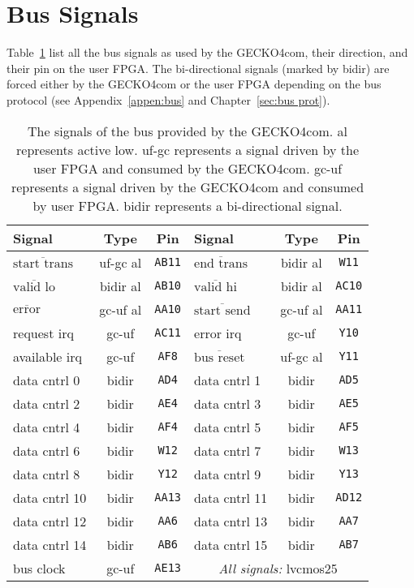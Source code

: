 \section{Bus Signals}
Table~\ref{tab:gecko4 bus signals} list all the bus signals as used by the {\sc
GECKO4com}, their direction, and their pin on the user FPGA. The bi-directional
signals (marked by {\sc bidir}) are forced either by the {\sc GECKO4com} or the
user FPGA depending on the bus protocol (see Appendix~\ref{appen:bus} and
Chapter~\ref{sec:bus prot}).
\begin{table}[hb]
\begin{tabular}{|l|c|c||l|c|c|}
\hline
\textbf{Signal}&\textbf{Type}&\textbf{Pin}&
\textbf{Signal}&\textbf{Type}&\textbf{Pin}\\
\hline
\hline
$\overline{\text{start trans}}$&{\sc uf-gc} {\sc al}&\verb+AB11+&
$\overline{\text{end trans}}$&{\sc bidir} {\sc al}&\verb+W11+\\
\hline
$\overline{\text{valid lo}}$&{\sc bidir} {\sc al}&\verb+AB10+&
$\overline{\text{valid hi}}$&{\sc bidir} {\sc al}&\verb+AC10+\\
\hline
$\overline{\text{error}}$&{\sc gc-uf} {\sc al}&\verb+AA10+&
$\overline{\text{start send}}$&{\sc gc-uf} {\sc al}&\verb+AA11+\\
\hline
request irq&{\sc gc-uf}&\verb+AC11+&
error irq&{\sc gc-uf}&\verb+Y10+\\
\hline
available irq&{\sc gc-uf}&\verb+AF8+&
$\overline{\text{bus reset}}$&{\sc uf-gc} {\sc al}&\verb+Y11+\\
\hline
data cntrl 0&{\sc bidir}&\verb+AD4+&
data cntrl 1&{\sc bidir}&\verb+AD5+\\
\hline
data cntrl 2&{\sc bidir}&\verb+AE4+&
data cntrl 3&{\sc bidir}&\verb+AE5+\\
\hline
data cntrl 4&{\sc bidir}&\verb+AF4+&
data cntrl 5&{\sc bidir}&\verb+AF5+\\
\hline
data cntrl 6&{\sc bidir}&\verb+W12+&
data cntrl 7&{\sc bidir}&\verb+W13+\\
\hline
data cntrl 8&{\sc bidir}&\verb+Y12+&
data cntrl 9&{\sc bidir}&\verb+Y13+\\
\hline
data cntrl 10&{\sc bidir}&\verb+AA13+&
data cntrl 11&{\sc bidir}&\verb+AD12+\\
\hline
data cntrl 12&{\sc bidir}&\verb+AA6+&
data cntrl 13&{\sc bidir}&\verb+AA7+\\
\hline
data cntrl 14&{\sc bidir}&\verb+AB6+&
data cntrl 15&{\sc bidir}&\verb+AB7+\\
\hline
bus clock&{\sc gc-uf}&\verb+AE13+&
\multicolumn{3}{c|}{\emph{All signals:} {\sc lvcmos25}}\\
\hline
\end{tabular}
\caption{The signals of the bus provided by the {\sc GECKO4com}. {\sc al}
represents active low. {\sc uf-gc} represents a signal driven by the user FPGA
and consumed by the {\sc GECKO4com}. {\sc gc-uf} represents a signal driven by
the {\sc GECKO4com} and consumed by user FPGA. {\sc bidir} represents a
bi-directional signal.}
\label{tab:gecko4 bus signals}
\end{table}
